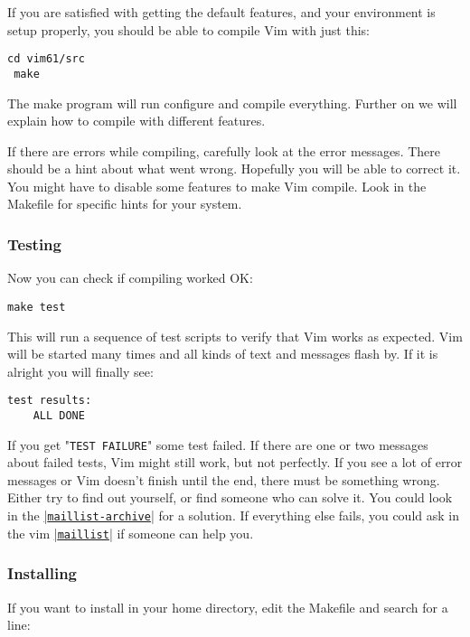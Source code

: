 If you are satisfied with getting the default features, and your environment is setup properly, you should be able to compile Vim with just this:

\begin{Verbatim}[samepage=true]
 cd vim61/src
 make
\end{Verbatim}

The make program will run configure and compile everything.
Further on we will explain how to compile with different features.

If there are errors while compiling, carefully look at the error messages.
There should be a hint about what went wrong.
Hopefully you will be able to correct it.
You might have to disable some features to make Vim compile.
Look in the Makefile for specific hints for your system.

\subsubsection{Testing}
Now you can check if compiling worked OK:

\begin{Verbatim}[samepage=true]
 make test
\end{Verbatim}

This will run a sequence of test scripts to verify that Vim works as expected.
Vim will be started many times and all kinds of text and messages flash by.
If it is alright you will finally see:

\begin{Verbatim}[samepage=true]
    test results: 
    ALL DONE 
\end{Verbatim}

If you get "\texttt{TEST FAILURE}" some test failed.
If there are one or two messages about failed tests, Vim might still work, but not perfectly.
If you see a lot of error messages or Vim doesn't finish until the end, there must be something wrong.
Either try to find out yourself, or find someone who can solve it.
You could look in the \hyperref[maillist-archive]{|\texttt{maillist-archive}|} for a solution.
If everything else fails, you could ask in the vim \hyperref[maillist]{|\texttt{maillist}|} if someone can help you.

\subsubsection{Installing}
\label{install-home}
If you want to install in your home directory, edit the Makefile and search for a line:

